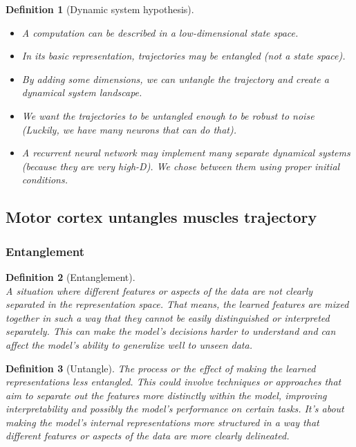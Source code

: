 \documentclass[11pt]{book} %
\newtheorem{definition}{Definition}[section]
\begin{document}
\begin{definition}[Dynamic system hypothesis]\ \\
    \begin{itemize}
        \item A computation can be described in a low-dimensional state space.
        \item In its basic representation, trajectories may be entangled (not a state space).
        \item By adding some dimensions, we can untangle the trajectory and create a dynamical system landscape.
        \item We want the trajectories to be untangled enough to be robust to noise (Luckily, we have many neurons that can do that).
        \item A recurrent neural network may implement many separate dynamical systems (because they are very high-D). We chose between them using proper initial conditions.
    \end{itemize}    
\end{definition}

\subsection{Motor cortex untangles muscles trajectory}

\subsubsection{Entanglement}
\begin{definition}[Entanglement]\ \\
    A situation where different features or aspects of the data are not clearly separated in the representation space. 
    That means, the learned features are mixed together in such a way that they cannot be easily distinguished or interpreted separately. 
    This can make the model's decisions harder to understand and can affect the model's ability to generalize well to unseen data. 
\end{definition}

\begin{definition}[Untangle]
    The process or the effect of making the learned representations less entangled. 
    This could involve techniques or approaches that aim to separate out the features more distinctly within the model, 
    improving interpretability and possibly the model's performance on certain tasks. 
    It's about making the model's internal representations more structured in a way that different features or aspects of the data are more clearly delineated.
\end{definition}
\end{document}
